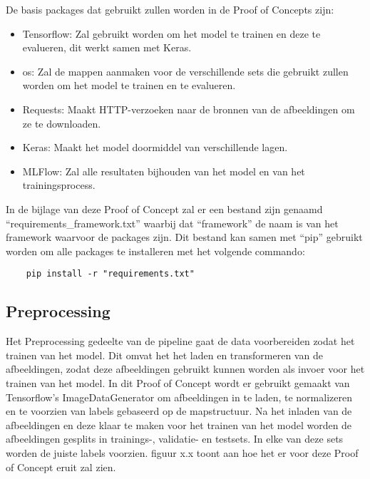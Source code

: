 De basis packages dat gebruikt zullen worden in de Proof of Concepts zijn:
\begin{itemize}
    \item Tensorflow: Zal gebruikt worden om het model te trainen en deze te evalueren, dit werkt samen met Keras.
    \item os: Zal de mappen aanmaken voor de verschillende sets die gebruikt zullen worden om het model te trainen en te evalueren.
    \item Requests: Maakt HTTP-verzoeken naar de bronnen van de afbeeldingen om ze te downloaden.
    \item Keras: Maakt het model doormiddel van verschillende lagen.
    \item MLFlow: Zal alle resultaten bijhouden van het model en van het trainingsprocess.
\end{itemize}

In de bijlage van deze Proof of Concept zal er een bestand zijn genaamd ``requirements\_framework.txt'' waarbij dat ``framework'' de naam is van het framework waarvoor de packages zijn. Dit bestand kan samen met ``pip'' gebruikt worden om alle packages te installeren met het volgende commando:

\begin{verbatim}
    pip install -r "requirements.txt"
\end{verbatim}

\subsection{Preprocessing}
Het Preprocessing gedeelte van de pipeline gaat de data voorbereiden zodat het trainen van het model. Dit omvat het het laden en transformeren van de afbeeldingen, zodat deze afbeeldingen gebruikt kunnen worden als invoer voor het trainen van het model. In dit Proof of Concept wordt er gebruikt gemaakt van Tensorflow's ImageDataGenerator om afbeeldingen in te laden, te normalizeren en te voorzien van labels gebaseerd op de mapstructuur. Na het inladen van de afbeeldingen en deze klaar te maken voor het trainen van het model worden de afbeeldingen gesplits in trainings-, validatie- en testsets. In elke van deze sets worden de juiste labels voorzien. figuur x.x toont aan hoe het er voor deze Proof of Concept eruit zal zien. 
